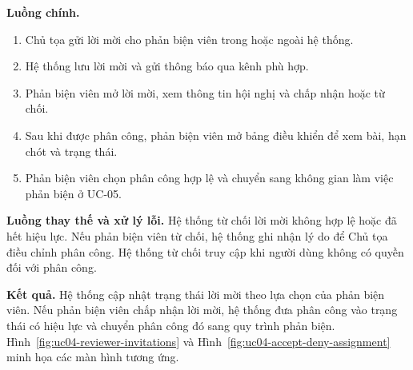 \textbf{Luồng chính.}

\begin{enumerate}
  \item Chủ tọa gửi lời mời cho phản biện viên trong hoặc ngoài hệ thống.
  \item Hệ thống lưu lời mời và gửi thông báo qua kênh phù hợp.
  \item Phản biện viên mở lời mời, xem thông tin hội nghị và chấp nhận hoặc từ chối.
  \item Sau khi được phân công, phản biện viên mở bảng điều khiển để xem bài, hạn chót và trạng thái.
  \item Phản biện viên chọn phân công hợp lệ và chuyển sang không gian làm việc phản biện ở UC-05.
\end{enumerate}

\textbf{Luồng thay thế và xử lý lỗi.} Hệ thống từ chối lời mời không hợp lệ hoặc đã hết hiệu lực. Nếu phản biện viên từ chối, hệ thống ghi nhận lý do để Chủ tọa điều chỉnh phân công. Hệ thống từ chối truy cập khi người dùng không có quyền đối với phân công.

\textbf{Kết quả.} Hệ thống cập nhật trạng thái lời mời theo lựa chọn của phản biện viên. Nếu phản biện viên chấp nhận lời mời, hệ thống đưa phân công vào trạng thái có hiệu lực và chuyển phân công đó sang quy trình phản biện. Hình~\ref{fig:uc04-reviewer-invitations} và Hình~\ref{fig:uc04-accept-deny-assignment} minh họa các màn hình tương ứng.

